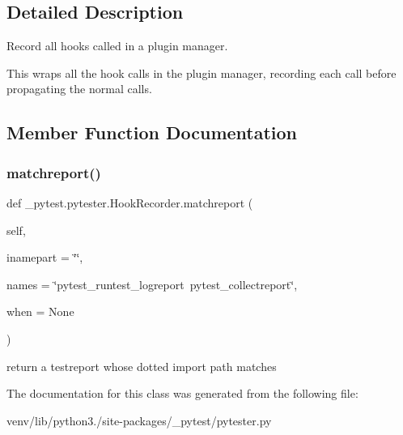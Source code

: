 \subsection{Detailed Description}
\begin{DoxyVerb}Record all hooks called in a plugin manager.

This wraps all the hook calls in the plugin manager, recording each call
before propagating the normal calls.\end{DoxyVerb}
 

\subsection{Member Function Documentation}
\mbox{\label{class__pytest_1_1pytester_1_1_hook_recorder_ac2cd71da5aceb43cf6d57b14429e92a9}} 
\subsubsection{\texorpdfstring{matchreport()}{matchreport()}}
{\footnotesize\ttfamily def \+\_\+pytest.\+pytester.\+Hook\+Recorder.\+matchreport (\begin{DoxyParamCaption}\item[{}]{self,  }\item[{}]{inamepart = {\ttfamily \char`\"{}\char`\"{}},  }\item[{}]{names = {\ttfamily \char`\"{}pytest\+\_\+runtest\+\_\+logreport~pytest\+\_\+collectreport\char`\"{}},  }\item[{}]{when = {\ttfamily None} }\end{DoxyParamCaption})}

\begin{DoxyVerb}return a testreport whose dotted import path matches\end{DoxyVerb}
 

The documentation for this class was generated from the following file\+:\begin{DoxyCompactItemize}
\item 
venv/lib/python3./site-\/packages/\+\_\+pytest/pytester.\+py\end{DoxyCompactItemize}
